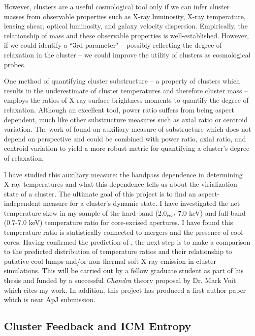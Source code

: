 \documentclass[11pt]{article}
\begin{document}
However, clusters are a useful cosmological tool only if we can infer
cluster masses from observable properties such as X-ray luminosity,
X-ray temperature, lensing shear, optical luminosity, and
galaxy velocity dispersion. Empirically, the relationship of mass and
these observable properties is well-established. However, if we could
identify a ``3rd parameter" -- possibly reflecting the degree of
relaxation in the cluster -- we could improve the utility of clusters
as cosmological probes.

One method of quantifying cluster substructure -- a property of
clusters which results in the underestimate of cluster temperatures
and therefore cluster mass -- employs the ratios of X-ray surface
brightness moments to quantify the degree of relaxation. Although an
excellent tool, power ratio suffers from being aspect dependent, much
like other substructure measures such as axial ratio or centroid
variation. The work of \cite{2001ApJ...546..100M} found an auxiliary
measure of substructure which does not depend on perspective and could
be combined with power ratio, axial ratio, and centroid variation to
yield a more robust metric for quantifying a cluster's degree of
relaxation.

I have studied this auxiliary measure: the bandpass dependence in
determining X-ray temperatures and what this dependence tells us about
the virialization state of a cluster. The ultimate goal of this
project is to find an aspect-independent measure for a cluster's
dynamic state. I have investigated the net temperature skew in my
sample of the hard-band (2.0$_{rest}$-7.0 keV) and full-band (0.7-7.0
keV) temperature ratio for core-excised apertures. I have found this
temperature ratio is statistically connected to mergers and the
presence of cool cores. Having confirmed the prediction of
\cite{2001ApJ...546..100M}, the next step is to make a comparison to
the predicted distribution of temperature ratios and their
relationship to putative cool lumps and/or non-thermal soft X-ray
emission in cluster simulations. This will be carried out by a fellow
graduate student as part of his thesis and funded by a successful
{\textit{Chandra}} theory proposal by Dr. Mark Voit which cites my
work. In addition, this project has produced a first author paper
which is near ApJ submission.

\subsection*{Cluster Feedback and ICM Entropy}
\end{document}
